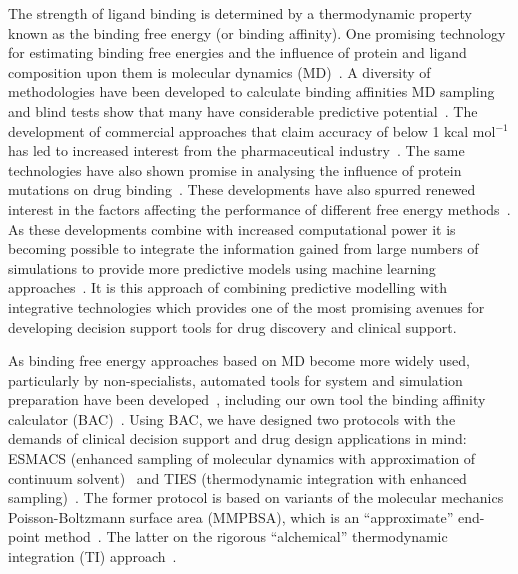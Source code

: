 The strength of ligand binding is determined by a thermodynamic property known
as the binding free energy (or binding affinity). 
One promising technology for
estimating binding free energies and the influence of protein and ligand
composition upon them is molecular dynamics (MD)~\cite{Karplus2005}. 
A diversity of methodologies have been developed to calculate binding affinities
MD sampling~\cite{Mobley2012} and blind tests show that many have considerable
predictive potential~\cite{Mey2017, Yin2017}.
The development of commercial approaches that claim accuracy of below 1 
kcal mol$^{-1}$
has led to increased interest from the 
pharmaceutical industry~\cite{Ganesan2017}.
The same technologies have also shown promise in analysing the influence of 
protein mutations on drug binding~\cite{Mondal2016, Bunney2015}.
These developments have also spurred renewed interest in the factors affecting 
the performance of different free energy 
methods~\cite{Aldeghi2017, Cappel2016, Ruiter2016}.
As these developments combine with increased computational power it is becoming 
possible to integrate the information gained from large numbers of simulations 
to provide more predictive models using machine learning approaches~\cite{Ash2017}.
It is this approach of combining predictive modelling with integrative technologies 
which provides one of the most promising avenues for developing decision support 
tools for drug discovery and clinical support.

As binding free energy approaches based on MD become more widely used, particularly by 
non-specialists, automated tools for system and simulation preparation 
have been developed~\cite{Gapsys2015, Doerr2016, Rizzi}, including our own tool 
the binding affinity calculator (BAC)~\cite{Sadiq2008}.
Using BAC, we have designed two protocols
with the demands of clinical decision support and drug design applications in
mind: ESMACS (enhanced sampling of molecular dynamics with approximation of
continuum solvent)~\cite{Wan2017brd4} and TIES (thermodynamic integration with
enhanced sampling)~\cite{Bhati2017}. 
The former protocol is based on variants
of the molecular mechanics Poisson-Boltzmann surface area (MMPBSA), which is
an ``approximate'' end-point method~\cite{Massova1999}. 
The latter on the rigorous ``alchemical'' thermodynamic integration (TI)
approach~\cite{Straatsma1988}. 

